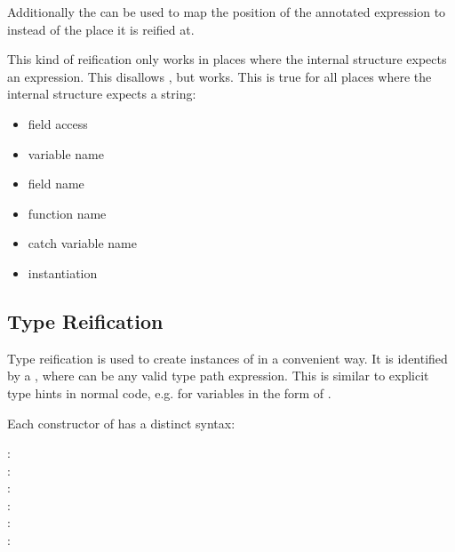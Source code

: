 Additionally the   can be used to map the position of the annotated expression to  instead of the place it is reified at.

This kind of reification only works in places where the internal structure expects an expression. This disallows , but  works. This is true for all places where the internal structure expects a string:

\begin{itemize}
	\item field access 
	\item variable name 
\end{itemize}
\begin{itemize}
	\item field name 
	\item function name 
	\item catch variable name 
	\item instantiation 
\end{itemize}


\subsection{Type Reification}
\label{macro-reification-type}

Type reification is used to create instances of  in a convenient way. It is identified by a , where  can be any valid type path expression. This is similar to explicit type hints in normal code, e.g. for variables in the form of .

Each constructor of  has a distinct syntax:

\begin{description}
	\item[:] 
	\item[:] 
	\item[:] 
	\item[:] 
	\item[:] 
	\item[:] 
\end{description}

